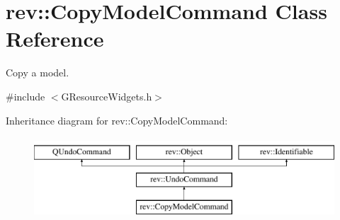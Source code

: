 \hypertarget{classrev_1_1_copy_model_command}{}\section{rev\+::Copy\+Model\+Command Class Reference}
\label{classrev_1_1_copy_model_command}


Copy a model.  




{\ttfamily \#include $<$G\+Resource\+Widgets.\+h$>$}

Inheritance diagram for rev\+::Copy\+Model\+Command\+:\begin{figure}[H]
\begin{center}
\leavevmode
\includegraphics[height=3.000000cm]{classrev_1_1_copy_model_command}
\end{center}
\end{figure}

